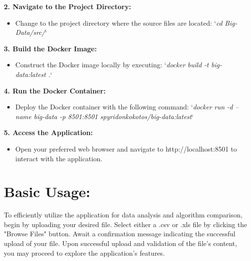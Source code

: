 \documentclass[unnumsec,webpdf,contemporary,large]{oup-authoring-template}%
\theoremstyle{thmstyleone}%
\theoremstyle{thmstyletwo}%
\theoremstyle{thmstylethree}%
\begin{document}
\textbf{2. Navigate to the Project Directory:}
\vspace{0.2cm}

\begin{itemize}
    \item Change to the project directory where the source files are located: `\textit{cd Big-Data/src/}`
\end{itemize}
\vspace{0.2cm}

\textbf{3. Build the Docker Image:}
\vspace{0.2cm}

\begin{itemize}
    \item Construct the Docker image locally by executing: `\textit{docker build -t big-data:latest .}`
\end{itemize}
\vspace{0.2cm}

\textbf{4. Run the Docker Container:}
\vspace{0.2cm}

\begin{itemize}
    \item Deploy the Docker container with the following command: `\textit{docker run -d --name big-data -p 8501:8501 spyridonkokotos/big-data:latest}`
\end{itemize}
\vspace{0.2cm}

\textbf{5. Access the Application:}
\vspace{0.2cm}

\begin{itemize}
    \item Open your preferred web browser and navigate to http://localhost:8501 to interact with the application.
\end{itemize}
\vspace{0.2cm}

\section{Basic Usage:}\label{sec3}
\vspace{0.2cm}

To efficiently utilize the application for data analysis and algorithm comparison, begin by uploading your desired file. Select either a .csv or .xls file by clicking the "Browse Files" button. Await a confirmation message indicating the successful upload of your file. Upon successful upload and validation of the file's content, you may proceed to explore the application's features.
\vspace{0.2cm}
\end{document}
